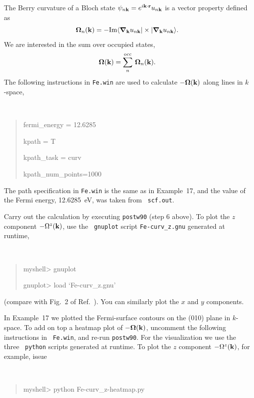 \documentclass[a4paper,11pt,twoside]{article}
\begin{document}
The  Berry curvature of a Bloch state $\psi_{n{\bf k}}=e^{i{\bf k}\cdot {\bf r}}u_{n{\bf k}}$ is a vector property defined as
$$
\bm{\Omega}_n({\bf k})=-{\rm Im}
\langle \bm{\nabla}_{\bf k} u_{n{\bf k}}\vert \times
\vert\bm{\nabla}_{\bf k} u_{n{\bf k}}\rangle.
$$
%
We are interested in the sum over occupied states,
$$
\bm{\Omega}({\bf k})=\sum_n^{\rm occ}\,\bm{\Omega}_n({\bf k}).
$$
%
The following instructions in {\tt Fe.win} are used to calculate
$-\bm{\Omega}({\bf k})$ along lines in $k$-space, 
{\tt
\begin{quote}
fermi\_energy = 12.6285

kpath = T

kpath\_task = curv

kpath\_num\_points=1000
\end{quote} }

The path specification in {\tt Fe.win} is the same as in Example~17,
and the value of the Fermi energy, 12.6285~eV, was taken from {\tt
  scf.out}. 

Carry out the calculation by executing {\tt postw90} (step 6
above). To plot the $z$ component $-\Omega^z({\bf k})$, use the {\tt
  gnuplot} script {\tt Fe-curv\_z.gnu} generated at runtime, 
{\tt
\begin{quote}
myshell> gnuplot

gnuplot> load `Fe-curv\_z.gnu'
\end{quote} }

(compare with Fig.~2 of Ref.~\cite{yao-prl04}).  You can similarly
plot the $x$ and $y$ components.

In Example~17 we plotted the Fermi-surface contours on the (010) plane
in $k$-space.  To add on top a heatmap plot of
$-\bm{\Omega}({\bf k})$, uncomment the following instructions in {\tt
  Fe.win}, 
%
and re-run {\tt postw90}.  For the visualization we use the three {\tt
  python} scripts generated at runtime. To plot the $z$ component
$-\Omega^z({\bf k})$, for example, issue
%
{\tt
\begin{quote}
myshell> python Fe-curv\_z-heatmap.py
\end{quote} }
\smallskip
\end{document}
